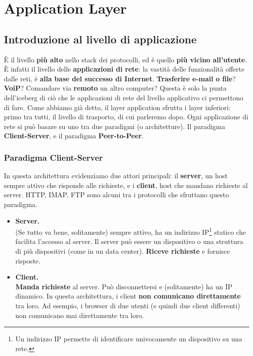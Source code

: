 \chapter{Application Layer}

\section{Introduzione al livello di applicazione}
È il livello \textbf{più alto} nello stack dei protocolli, ed è quello \textbf{più vicino all'utente}. È infatti il livello delle \textbf{applicazioni di rete}: la vastità delle funzionalità offerte dalle reti, è \textbf{alla base del successo di Internet}. \textbf{Trasferire e-mail o file}? \textbf{VoiP}? Comandare via \textbf{remoto} un altro computer? Questa è solo la punta dell'iceberg di ciò che le applicazioni di rete del livello applicativo ci permettono di fare. Come abbiamo già detto, il layer application sfrutta i layer inferiori: primo tra tutti, il livello di trasporto, di cui parleremo dopo. Ogni applicazione di rete si può basare su uno tra due paradigmi (o architetture). Il paradigma \textbf{Client-Server}, e il paradigma \textbf{Peer-to-Peer}.

\subsection{Paradigma Client-Server}
In questa architettura evidenziamo due attori principali: il \textbf{server}, un host sempre attivo che risponde alle richieste, e i \textbf{client}, host che mandano richieste al server. HTTP, IMAP, FTP sono alcuni tra i protocolli che sfruttano questo paradigma.

\begin{itemize}
    \item \textbf{Server.}\\
    (Se tutto va bene, solitamente) sempre attivo, ha un indirizzo IP\footnote{Un indirizzo IP permette di identificare univocamente un dispositivo su una rete.} statico che facilita l'accesso al server. Il server può essere un dispositivo o una struttura di più dispositivi (come in un data center). \textbf{Riceve richieste} e fornisce risposte.
    \item \textbf{Client.}\\
    \textbf{Manda richieste} al server. Può disconnettersi e (solitamente) ha un IP dinamico. In questa architettura, i client \textbf{non comunicano direttamente} tra loro. Ad esempio, i browser di due utenti (e quindi due client differenti) non comunicano mai direttamente tra loro. 
\end{itemize}


